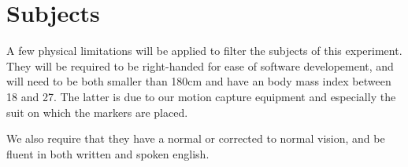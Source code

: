 \section{Subjects}

A few physical limitations will be applied to filter the subjects of this experiment. They will be required to be right-handed for ease of software developement, and will need to be both smaller than 180cm and have an body mass index between 18 and 27. The latter is due to our motion capture equipment and especially the suit on which the markers are placed.

We also require that they have a normal or corrected to normal vision, and be fluent in both written and spoken english.
